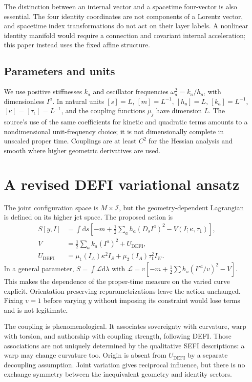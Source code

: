 \documentclass[aip,jmp,reprint,onecolumn,amsmath,amssymb]{revtex4-2}
\newcommand{\dd}{\mathrm{d}}
\newcommand{\Ds}{D_s}
\newcommand{\I}{\mathcal I}
\newcommand{\U}{U_{\mathrm{DEFI}}}
\begin{document}
The distinction between an internal vector and a spacetime four-vector is also essential. The four identity coordinates are not components of a Lorentz vector, and spacetime index transformations do not act on their layer labels. A nonlinear identity manifold would require a connection and covariant internal acceleration; this paper instead uses the fixed affine structure.

\subsection{Parameters and units}
We use positive stiffnesses $k_a$ and oscillator frequencies $\omega_a^2=k_a/h_a$, with dimensionless $I^a$. In natural units $[s]=L$, $[m]=L^{-1}$, $[h_a]=L$, $[k_a]=L^{-1}$, $[\kappa]=[\tau_1]=L^{-1}$, and the coupling functions $\mu_j$ have dimension $L$. The source's use of the same coefficients for kinetic and quadratic terms amounts to a nondimensional unit-frequency choice; it is not dimensionally complete in unscaled proper time. Couplings are at least $C^2$ for the Hessian analysis and smooth where higher geometric derivatives are used.

\section{A revised DEFI variational ansatz}
The joint configuration space is $M\times\I$, but the geometry-dependent Lagrangian is defined on its higher jet space. The proposed action is
\begin{align}
 S[y,I]&=\int\dd s\left[-m+\tfrac12\sum_a h_a(\Ds I^a)^2-V(I;\kappa,\tau_1)\right],\label{eq:action}\\
 V&=\tfrac12\sum_a k_a(I^a)^2+\U,\label{eq:potential}\\
 \U&=\mu_1(I_A)\kappa^2 I_S+\mu_2(I_A)\tau_1^2 I_W.\label{eq:coupling}
\end{align}
In a general parameter, $S=\int\mathcal L\dd\lambda$ with $\mathcal L=v[-m+\frac12\sum h_a(I'^a/v)^2-V]$. This makes the dependence of the proper-time measure on the varied curve explicit. Orientation-preserving reparametrizations leave the action unchanged. Fixing $v=1$ before varying $y$ without imposing its constraint would lose terms and is not legitimate.

The coupling is phenomenological. It associates sovereignty with curvature, warp with torsion, and authorship with coupling strength, following DEFI. Those associations are not uniquely determined by the qualitative SEFI descriptions: a warp may change curvature too. Origin is absent from $\U$ by a separate decoupling assumption. Joint variation gives reciprocal influence, but there is no exchange symmetry between the inequivalent geometry and identity sectors.
\end{document}
